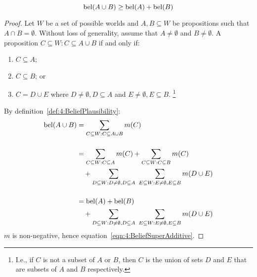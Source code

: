 \begin{thm}
  \begin{equation}
    \label{eqn:4:BeliefSuperAdditive}
    \operatorname*{bel}(A \cup B) \geq \operatorname*{bel}(A) + \operatorname*{bel}(B)
  \end{equation}

  \begin{proof}
    Let $W$ be a set of possible worlds and $A, B \subseteq W$ be propositions such
    that $A \cap B = \emptyset$.
    Without loss of generality, assume that $A \neq \emptyset$ and $B \neq
      \emptyset$.
    A proposition $C \subseteq W : C \subseteq A \cup B$ if and only if:
    \begin{enumerate}
      \item $C \subseteq A$;
      \item $C \subseteq B$; or
      \item $C = D \cup E$ where $D \neq \emptyset, D \subseteq A$ and
            $E \neq \emptyset, E \subseteq B$.
            \footnote{
              I.e., if $C$ is not a subset of $A$ or $B$, then $C$ is the union of
              sets $D$ and $E$ that are subsets of $A$ and $B$ respectively.
            }
    \end{enumerate}
    By definition~\ref{def:4:BeliefPlausibility}:
    \begin{align*}
      \operatorname*{bel}(A \cup B)
       & = \sum_{C \subseteq W : C \subseteq A \cup B} m(C)
      \\[3ex]
       & = \sum_{C \subseteq W : C \subseteq A} m(C)
      + \sum_{C \subseteq W : C \subseteq B} m(C)
      \\
       & \quad + \sum_{D \subseteq W : D \neq \emptyset, D \subseteq A}\
      \sum_{E \subseteq W : E \neq \emptyset, E \subseteq B}
      m(D \cup E)
      \\[3ex]
       & = \operatorname*{bel}(A) + \operatorname*{bel}(B)
      \\
       & \quad + \sum_{D \subseteq W : D \neq \emptyset, D \subseteq A}\
      \sum_{E \subseteq W : E \neq \emptyset, E \subseteq B} m(D \cup E)
    \end{align*}
    $m$ is non-negative, hence equation~\ref{eqn:4:BeliefSuperAdditive}.
  \end{proof}
\end{thm}

